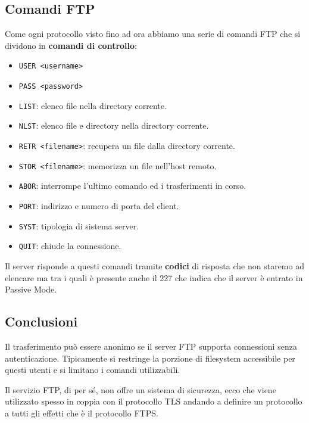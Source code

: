 \subsection{Comandi FTP}
Come ogni protocollo visto fino ad ora abbiamo una serie di comandi FTP
che si dividono in \textbf{comandi di controllo}:
\begin{itemize}
	\item \verb|USER <username>|
	\item \verb|PASS <password>|
	\item \verb|LIST|: elenco file nella directory corrente.
	\item \verb|NLST|: elenco file e directory nella directory 
		corrente.
	\item \verb|RETR <filename>|: recupera un file dalla directory 
		corrente.
	\item \verb|STOR <filename>|: memorizza un file nell'host remoto.
	\item \verb|ABOR|: interrompe l'ultimo comando ed i trasferimenti 
		in corso.
	\item \verb|PORT|: indirizzo e numero di porta del client.
	\item \verb|SYST|: tipologia di sistema server.
	\item \verb|QUIT|: chiude la connessione.
\end{itemize}
Il server risponde a questi comandi tramite \textbf{codici} di 
risposta che non staremo ad elencare ma tra i quali è presente anche 
il 227 che indica che il server è entrato in Passive Mode.

\subsection{Conclusioni}
Il trasferimento può essere anonimo se il server FTP supporta 
connessioni senza autenticazione. Tipicamente si restringe la porzione 
di filesystem accessibile per questi utenti e si limitano i comandi 
utilizzabili.

Il servizio FTP, di per sé, non offre un sistema di sicurezza, ecco che
viene utilizzato spesso in coppia con il protocollo TLS andando a 
definire un protocollo a tutti gli effetti che è il protocollo FTPS.
